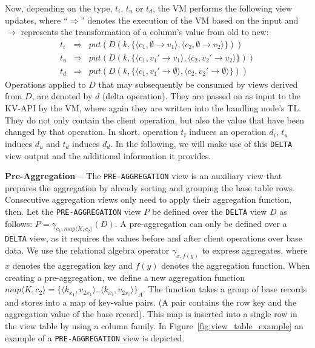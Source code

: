 Now, depending on the type, $t_i$, $t_u$ or $t_d$, the VM performs the
following view updates, where ``$\Rightarrow$'' denotes the execution
of the VM based on the input and $\rightarrow$ represents the
transformation of a column's value from old to new:
%
\begin{eqnarray}
t_i & \Rightarrow  & put(D(k,\{\langle c_1,\emptyset \rightarrow v_1\rangle,\langle c_2,\emptyset \rightarrow v_2\rangle\}))\\
t_u & \Rightarrow & put(D(k,\{\langle c_1,v_1'\rightarrow v_1\rangle,\langle c_2,v_2' \rightarrow v_2\rangle\}))\\
t_d & \Rightarrow & put(D(k,\{\langle c_1,v_1' \rightarrow \emptyset\rangle,\langle c_2,v_2' \rightarrow \emptyset\rangle\}))
\end{eqnarray}
%
Operations applied to $D$ that may subsequently be consumed by views
derived from $D$, are denoted by $d$ (delta operation). They are
passed on as input to the KV-API by the VM, where again they are
written into the handling node's TL.  They do not only contain the 
client operation, but also the value that have been changed by that 
operation.
%
In short, operation $t_i$ induces an operation $d_i$, $t_u$ induces
$d_u$ and $t_d$ induces $d_d$. In the following, we will make use of
this \texttt{DELTA} view output and the additional information it
provides.



\noindent  
\textbf{Pre-Aggregation --} The \texttt{PRE-AGGREGATION} view is an 
auxiliary view that prepares the aggregation by already sorting and 
grouping the base table rows. Consecutive aggregation views only need 
to apply their aggregation function, then.
%
Let the \texttt{PRE-AGGREGATION} view $P$ be defined over the 
\texttt{DELTA} view $D$ as follows: $P=\gamma_{c_1,map\langle K,c_2\rangle}(D)$. 
A pre-aggregation can only be defined over a \texttt{DELTA} view, as it 
requires the values before and after client operations over base data. 
We use the relational algebra operator $\gamma_{x,f(y)}$ to express 
aggregates, where $x$ denotes the aggregation key and $f(y)$ denotes the 
aggregation function. When creating a pre-aggregation, we define a new 
aggregation function $map\langle K,c_2\rangle=\{\langle k_{x_1},v_{2x_1} 
\rangle..\langle k_{x_i}, v_{2x_i} \rangle\}_A$. The function takes a 
group of base records and stores into a map of key-value pairs. (A pair 
contains the row key and the aggregation value of the base record). This 
map is inserted into a single row in the view table by using a column 
family. In Figure~\ref{fig:view_table_example} an example of a 
\texttt{PRE-AGGREGATION} view is depicted. 



